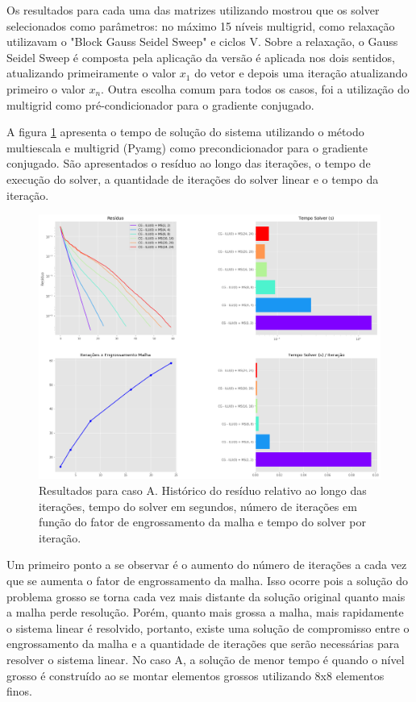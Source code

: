 Os resultados para cada uma das matrizes utilizando mostrou que os solver selecionados como parâmetros: no máximo 15 níveis multigrid, como relaxação utilizavam o "Block Gauss Seidel Sweep" e ciclos V. Sobre a relaxação, o Gauss Seidel Sweep é composta pela aplicação da versão é aplicada nos dois sentidos, atualizando primeiramente o valor  $x_1$  do vetor e depois uma iteração atualizando primeiro o valor  $x_n$. Outra escolha comum para todos os casos, foi a utilização do multigrid como pré-condicionador para o gradiente conjugado.


A figura \ref{fig:reservatorio100x100_1} apresenta o tempo de solução do sistema utilizando o método multiescala e multigrid (Pyamg) como precondicionador para o gradiente conjugado. São apresentados o resíduo ao longo das iterações, o tempo de execução do solver, a quantidade de iterações do solver linear e o tempo da iteração.

\begin{figure}[!htbp]
\label{fig:reservatorio100x100_1}
\centering
\includegraphics[width=\textwidth]{chap08/figs/reservatorio100x100_1.png}
\caption{Resultados para caso A. Histórico do resíduo relativo ao longo das iterações, tempo do solver em segundos, número de iterações em função do fator de engrossamento da malha e tempo do solver por iteração. }
\end{figure}

Um primeiro ponto a se observar é o aumento do número de iterações a cada vez que se aumenta o fator de engrossamento da malha. Isso ocorre pois a solução do problema grosso se torna cada vez mais distante da solução  original quanto mais a malha perde resolução. Porém, quanto mais grossa a malha, mais rapidamente o sistema linear é resolvido, portanto, existe uma solução de compromisso entre o engrossamento da malha e a quantidade de iterações que serão necessárias para resolver o sistema linear. No caso A, a solução de menor tempo é quando o nível grosso é construído ao se montar elementos grossos utilizando 8x8 elementos finos. 

